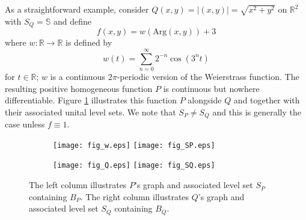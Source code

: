 \documentclass[11pt]{article}
\newenvironment{example}
  {\pushQED{\qed}\renewcommand{\qedsymbol}{$\triangle$}\examplex}
  {\popQED\endexamplex}
\theoremstyle{remark}
\newcommand{\lp}{\left(}
\newcommand{\rp}{\right)}
\begin{document}
\begin{example}
\noindent  As a straightforward example, consider $Q(x,y)=|(x,y)|=\sqrt{x^2+y^2}$ on $\mathbb{R}^2$ with $S_Q=\mathbb{S}$ and define
\begin{equation*}
f(x,y)=w(\mbox{Arg}(x,y))+3
\end{equation*}
where $w:\mathbb{R}\to\mathbb{R}$ is defined by
\begin{equation*}
    w(t) = \sum_{n=0}^\infty 2^{-n} \cos\lp 3^n t \rp
\end{equation*}
for $t\in\mathbb{R}$; $w$ is a continuous $2\pi$-periodic version of the Weierstrass function. The resulting positive homogeneous function $P$ is continuous but nowhere differentiable. Figure \ref{fig:Weierstrass} illustrates this function $P$ alongside $Q$ and together with their associated unital level sets. We note that $S_P\neq S_Q$ and this is generally the case unless $f\equiv 1$.

\begin{figure}[!htb]
    \centering
    \hspace{10pt}
    \begin{subfigure}{0.5\textwidth}
    \centering
    \texttt{[image: fig\_w.eps]}
    \vspace{-10pt}
    \texttt{[image: fig\_SP.eps]}
    \end{subfigure}%
    \hspace{-20pt}
    \begin{subfigure}{0.5\textwidth}
    \centering
    \texttt{[image: fig\_Q.eps]}
    \vspace{-10pt}
    \texttt{[image: fig\_SQ.eps]}
    \end{subfigure}
    \caption{The left column illustrates $P$'s graph and associated level set $S_P$ containing $B_P$. The right column illustrates $Q$'s graph and associated level set $S_Q$ containing $B_Q$.}
    \label{fig:Weierstrass}
\end{figure}
\end{example}
\end{document}

